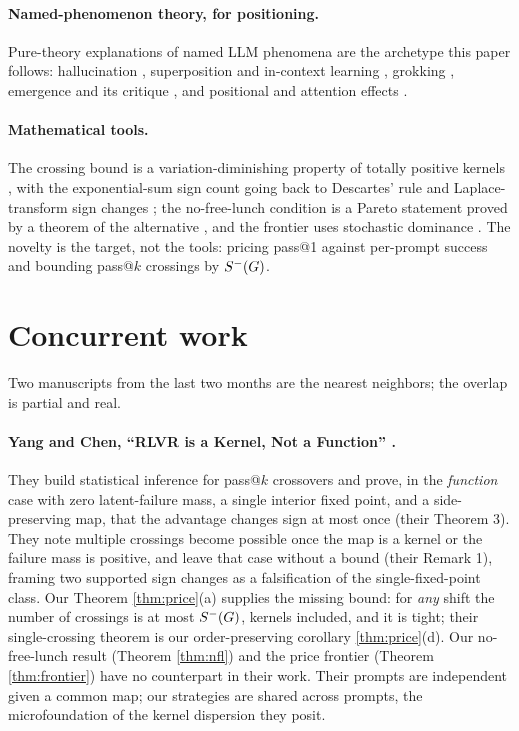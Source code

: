 \paragraph{Named-phenomenon theory, for positioning.}
Pure-theory explanations of named LLM phenomena are the archetype this paper
follows: hallucination
\citep{kalai25hallucinate,xu24hallinevitable}, superposition and in-context
learning \citep{elhage22superposition,vonoswald23icl,olsson22induction}, grokking
\citep{power22grokking,nanda23progress}, emergence and its critique
\citep{wei22emergent,schaeffer23mirage}, and positional and attention effects
\citep{liu24lostmiddle,xiao24attnsink}.

\paragraph{Mathematical tools.}
The crossing bound is a variation-diminishing property of totally positive
kernels \citep{karlin68tp,schoenberg51pff,schoenberg30vdt,karlinstudden66}, with
the exponential-sum sign count going back to Descartes' rule
\citep{jameson06descartes} and Laplace-transform sign changes
\citep{widder41laplace}; the no-free-lunch condition is a Pareto statement proved
by a theorem of the alternative \citep{mangasarian69nlp,miettinen99moo}, and the
frontier uses stochastic dominance \citep{shaked07stochorders}. The novelty is
the target, not the tools: pricing pass@1 against per-prompt success and bounding
pass@$k$ crossings by $S^{-}(G)$.

\section{Concurrent work}
\label{sec:concurrent}

Two manuscripts from the last two months are the nearest neighbors; the overlap
is partial and real.

\paragraph{Yang and Chen, ``RLVR is a Kernel, Not a Function''
\citep{yangchen2026kernel}.}
They build statistical inference for pass@$k$ crossovers and prove, in the
\emph{function} case with zero latent-failure mass, a single interior fixed
point, and a side-preserving map, that the advantage changes sign at most once
(their Theorem 3). They note multiple crossings become possible once the map is a
kernel or the failure mass is positive, and leave that case without a bound
(their Remark 1), framing two supported sign changes as a falsification of the
single-fixed-point class. Our Theorem \ref{thm:price}(a) supplies the missing
bound: for \emph{any} shift the number of crossings is at most $S^{-}(G)$,
kernels included, and it is tight; their single-crossing theorem is our
order-preserving corollary \ref{thm:price}(d). Our no-free-lunch result (Theorem
\ref{thm:nfl}) and the price frontier (Theorem \ref{thm:frontier}) have no
counterpart in their work. Their prompts are independent given a common map; our
strategies are shared across prompts, the microfoundation of the kernel
dispersion they posit.

